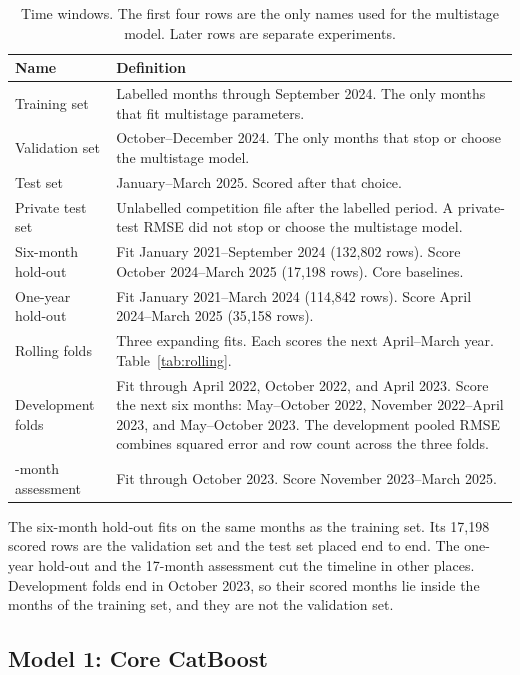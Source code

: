 \documentclass[11pt,a4paper]{article}
\begin{document}
\begin{table}[htbp]
\centering
\caption{Time windows.
The first four rows are the only names used for the multistage model.
Later rows are separate experiments.}
\label{tab:windows}
\small
\setlength{\tabcolsep}{3pt}
\begin{tabularx}{\textwidth}{@{}>{\raggedright\arraybackslash}p{}X@{}}
\toprule
Name & Definition \\
\midrule
Training set &
Labelled months through September 2024.
The only months that fit multistage parameters. \\
Validation set &
October--December 2024.
The only months that stop or choose the multistage model. \\
Test set &
January--March 2025.
Scored after that choice. \\
Private test set &
Unlabelled competition file after the labelled period.
A private-test RMSE did not stop or choose the multistage model. \\
Six-month hold-out &
Fit January 2021--September 2024 (132{,}802 rows).
Score October 2024--March 2025 (17{,}198 rows).
Core baselines. \\
One-year hold-out &
Fit January 2021--March 2024 (114{,}842 rows).
Score April 2024--March 2025 (35{,}158 rows). \\
Rolling folds &
Three expanding fits.
Each scores the next April--March year.
Table~\ref{tab:rolling}. \\
Development folds &
Fit through April 2022, October 2022, and April 2023.
Score the next six months: May--October 2022, November 2022--April 2023, and May--October 2023.
The development pooled RMSE combines squared error and row count across the three folds. \\
17-month assessment &
Fit through October 2023.
Score November 2023--March 2025. \\
\bottomrule
\end{tabularx}
\end{table}

The six-month hold-out fits on the same months as the training set.
Its 17{,}198 scored rows are the validation set and the test set placed end to end.
The one-year hold-out and the 17-month assessment cut the timeline in other places.
Development folds end in October 2023, so their scored months lie inside the months of the training set, and they are not the validation set.

\subsection{Model 1: Core CatBoost}
\label{sec:core-model}
\end{document}
